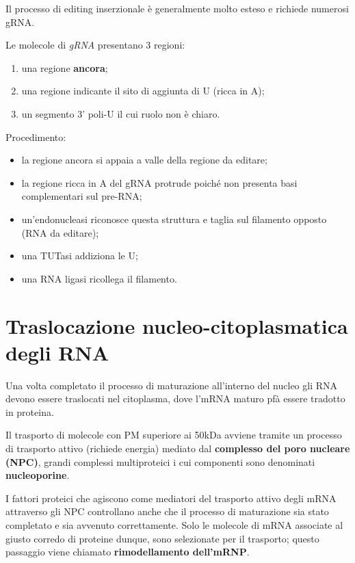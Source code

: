 \documentclass[11pt]{book}
\begin{document}
Il processo di editing inserzionale è generalmente molto esteso e
richiede numerosi gRNA.

Le molecole di \emph{gRNA} presentano 3 regioni:

\begin{enumerate}
\def\labelenumi{\arabic{enumi}.}
\itemsep1pt\parskip0pt
\item
  una regione \textbf{ancora};
\item
  una regione indicante il sito di aggiunta di U (ricca in A);
\item
  un segmento 3' poli-U il cui ruolo non è chiaro.
\end{enumerate}

Procedimento:

\begin{itemize}
\itemsep1pt\parskip0pt
\item
  la regione ancora si appaia a valle della regione da editare;
\item
  la regione ricca in A del gRNA protrude poiché non presenta basi
  complementari sul pre-RNA;
\item
  un'endonucleasi riconosce questa struttura e taglia sul filamento
  opposto (RNA da editare);
\item
  una TUTasi addiziona le U;
\item
  una RNA ligasi ricollega il filamento.
\end{itemize}

\section{Traslocazione nucleo-citoplasmatica degli
RNA}\label{traslocazione-nucleo-citoplasmatica-degli-rna}

Una volta completato il processo di maturazione all'interno del nucleo
gli RNA devono essere traslocati nel citoplasma, dove l'mRNA maturo pfà
essere tradotto in proteina.

Il trasporto di molecole con PM superiore ai 50kDa avviene tramite un
processo di trasporto attivo (richiede energia) mediato dal
\textbf{complesso del poro nucleare (NPC)}, grandi complessi
multiproteici i cui componenti sono denominati \textbf{nucleoporine}.

I fattori proteici che agiscono come mediatori del trasporto attivo
degli mRNA attraverso gli NPC controllano anche che il processo di
maturazione sia stato completato e sia avvenuto correttamente. Solo le
molecole di mRNA associate al giusto corredo di proteine dunque, sono
selezionate per il trasporto; questo passaggio viene chiamato
\textbf{rimodellamento dell'mRNP}.
\end{document}
